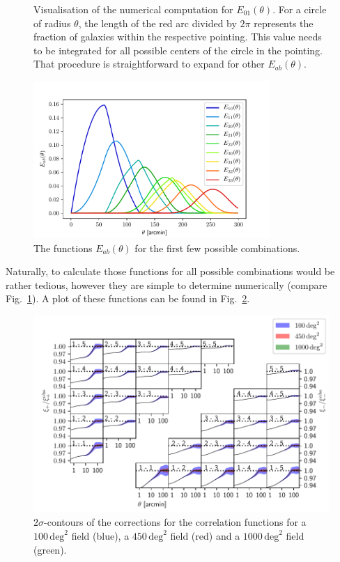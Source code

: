 \documentclass[referee]{aa} %
\renewcommand{\[}{\begin{equation}}
\renewcommand{\]}{\end{equation}}
\renewcommand{\rm}{\mathrm}
\begin{document}
\begin{appendix}
\begin{figure}
\centering
\def\svgwidth{120pt}

\caption[Visualisation of the numerical computation for $E_{01}(\theta)$.]{Visualisation of the numerical computation for $E_{01}(\theta)$. For a circle of radius $\theta$, the length of the red arc divided by $2\pi$ represents the fraction of galaxies within the respective pointing. This value needs to be integrated for all possible centers of the circle in the pointing. That procedure is straightforward to expand for other $E_{ab}(\theta)$.}
\label{fig:eoftheta_sim}
\end{figure}

\begin{figure}
\centering
\includegraphics[width = 0.8\textwidth]{images/eab.pdf}
\caption{The functions $E_{ab}(\theta)$ for the first few possible combinations.}
\label{fig:eab}
\end{figure}
Naturally, to calculate those functions for all possible combinations would be rather tedious, however they are simple to determine numerically (compare Fig.~\ref{fig:eoftheta_sim}). A plot of these functions can be found in Fig.~\ref{fig:eab}.

\begin{figure}
\centering
\includegraphics[width=\textwidth]{images/finite_footprint.pdf}
\caption{$2\sigma$-contours of the corrections for the correlation functions for a $100\,\rm{deg}^2$ field (blue), a $450\,\rm{deg}^2$ field (red) and a $1000\,\rm{deg}^2$ field (green).}
\label{fig:finite_footprint}
\end{figure}


\end{appendix}
\end{document}
